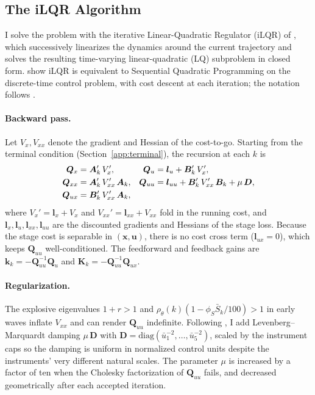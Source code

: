 \documentclass[12pt, a4paper]{article}
\begin{document}
\subsection{The iLQR Algorithm}
\label{app:ilqr}

I solve the problem with the iterative Linear-Quadratic Regulator (iLQR) of
\citet{li2004iterative}, which successively linearizes the dynamics around the
current trajectory and solves the resulting time-varying linear-quadratic (LQ)
subproblem in closed form.
\citet{sharma2025sqp} show iLQR is equivalent to Sequential Quadratic Programming
on the discrete-time control problem, with cost descent at each iteration; the
notation follows \citet[Chapters~3--4]{bertsekas2017dynamic}.

\paragraph{Backward pass.}
Let $V_x, V_{xx}$ denote the gradient and Hessian of the cost-to-go. Starting from
the terminal condition (Section~\ref{app:terminal}), the recursion at each $k$ is
%
\begin{align}
    \bm{Q}_x  &= \bm{A}_k'\,V_x', &
    \bm{Q}_u  &= \bm{l}_u + \bm{B}_k'\,V_x', \notag \\
    \bm{Q}_{xx} &= \bm{A}_k'\,V_{xx}'\,\bm{A}_k, &
    \bm{Q}_{uu} &= \bm{l}_{uu} + \bm{B}_k'\,V_{xx}'\,\bm{B}_k + \mu\,\bm{D}, \\
    \bm{Q}_{ux} &= \bm{B}_k'\,V_{xx}'\,\bm{A}_k, \notag
\end{align}
%
where $V_x' = \bm{l}_x + V_x$ and $V_{xx}' = \bm{l}_{xx} + V_{xx}$ fold in the
running cost, and $\bm{l}_x, \bm{l}_u, \bm{l}_{xx}, \bm{l}_{uu}$ are the
discounted gradients and Hessians of the stage loss. Because the stage cost is
separable in $(\bm{x}, \bm{u})$, there is no cost cross term ($\bm{l}_{ux} = 0$),
which keeps $\bm{Q}_{uu}$ well-conditioned. The feedforward and feedback gains are
$\bm{k}_k = -\bm{Q}_{uu}^{-1}\bm{Q}_u$ and
$\bm{K}_k = -\bm{Q}_{uu}^{-1}\bm{Q}_{ux}$.

\paragraph{Regularization.}
The explosive eigenvalues $1+r > 1$ and
$\rho_\theta(k)(1-\phi_S\bar{S}_k/100) > 1$ in early waves inflate $V_{xx}$ and
can render $\bm{Q}_{uu}$ indefinite. Following \citet{tassa2014control}, I add
Levenberg--Marquardt damping $\mu\,\bm{D}$ with
$\bm{D} = \mathrm{diag}(\bar u_1^{-2}, \ldots, \bar u_5^{-2})$, scaled by the
instrument caps so the damping is uniform in normalized control units despite
the instruments' very different natural scales. The parameter $\mu$ is increased
by a factor of ten when the Cholesky factorization of $\bm{Q}_{uu}$ fails, and
decreased geometrically after each accepted iteration.
\end{document}

